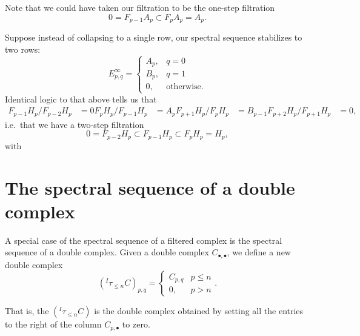 \documentclass[main.tex]{subfiles}
\begin{document}
\begin{example}
  Note that we could have taken our filtration to be the one-step filtration
  \begin{equation*}
    0 = F_{p-1}A_{p} \subset F_{p}A_{p} = A_{p}.
  \end{equation*}
\end{example}

\begin{example}
  Suppose instead of collapsing to a single row, our spectral sequence stabilizes to two rows:
  \begin{equation*}
    E^{\infty}_{p, q} =
    \begin{cases}
      A_{p}, &q = 0 \\
      B_{p}, &q = 1 \\
      0, &\text{otherwise.}
    \end{cases}
  \end{equation*}
  Identical logic to that above tells us that
  \begin{align*}
    F_{p-1}H_{p}/F_{p-2}H_{p} &= 0
    F_{p}H_{p}/F_{p-1}H_{p} &= A_{p}
    F_{p+1}H_{p}/F_{p}H_{p} &= B_{p-1}
    F_{p+2}H_{p}/F_{p+1}H_{p} &= 0,
  \end{align*}
  i.e.\ that we have a two-step filtration
  \begin{equation*}
    0 = F_{p-2}H_{p} \subset F_{p-1}H_{p} \subset F_{p}H_{p} = H_{p},
  \end{equation*}
  with
\end{example}

\section{The spectral sequence of a double complex}
\label{sec:the_spectral_sequence_of_a_double_complex}

A special case of the spectral sequence of a filtered complex is the spectral sequence of a double complex. Given a double complex $C_{\bullet,\bullet}$, we define a new double complex
\begin{equation*}
  \left(^{I}\tau_{\leq n}C\right)_{p,q} =
  \begin{cases}
    C_{p,q} & p \leq n \\
    0, & p > n
  \end{cases}.
\end{equation*}

That is, the $\left(^{I}\tau_{\leq n}C\right)$ is the double complex obtained by setting all the entries to the right of the column $C_{p, \bullet}$ to zero.
\end{document}
